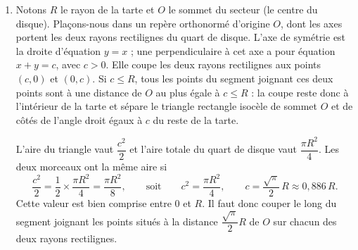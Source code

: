 \begin{enumerate}
\begin{enumerate}
    \item La subvention de 1000 euros est versée par l'État et vient en déduction de ce que paie le groupe.

    Pour $n = 90$, la recette doit être de 4000 euros, dont 1000 euros viennent de l'État ; le groupe paie donc 3000 euros, soit $\dfrac{3000}{90} = 33{,}333\ldots$ euros par personne, c'est-à-dire $33{,}34$ euros (arrondi au centime supérieur).

    Pour $n = 120$, chacun doit son menu à 40 euros (la recette est $4800 \geqslant 4000$ euros) et la subvention de 1000 euros se répartit entre les 120 convives : chacun paie $40 - \dfrac{1000}{120} = 31{,}666\ldots$, soit environ $31{,}67$ euros.

    Pour comparer, notons $P(n)$ le prix payé par chaque convive.
    \begin{itemize}
        \item Si $n \geqslant 100$, $P(n) = 40 - \dfrac{1000}{n}$. Cette quantité est croissante avec $n$ (car $\dfrac{1000}{n}$ décroît), donc elle est minimale pour $n = 100$ et vaut alors $30$ euros.
        \item Si $n < 100$, $P(n) = \dfrac{4000 - 1000}{n} = \dfrac{3000}{n}$. Cette quantité est décroissante avec $n$, donc elle est minimale pour $n = 99$, et vaut $\dfrac{3000}{99} \approx 30{,}30 > 30 = \dfrac{3000}{100}$.
    \end{itemize}
    Conclusion : le prix par convive est minimal lorsque \emph{exactement} $100$ personnes viennent, et il vaut alors $30$ euros.
\end{enumerate}

\item Notons $R$ le rayon de la tarte et $O$ le sommet du secteur (le centre du disque). Plaçons-nous dans un repère orthonormé d'origine $O$, dont les axes portent les deux rayons rectilignes du quart de disque. L'axe de symétrie est la droite d'équation $y = x$ ; une perpendiculaire à cet axe a pour équation $x + y = c$, avec $c > 0$. Elle coupe les deux rayons rectilignes aux points $(c, 0)$ et $(0, c)$. Si $c \leqslant R$, tous les points du segment joignant ces deux points sont à une distance de $O$ au plus égale à $c \leqslant R$ : la coupe reste donc à l'intérieur de la tarte et sépare le triangle rectangle isocèle de sommet $O$ et de côtés de l'angle droit égaux à $c$ du reste de la tarte.

L'aire du triangle vaut $\dfrac{c^2}{2}$ et l'aire totale du quart de disque vaut $\dfrac{\pi R^2}{4}$. Les deux morceaux ont la même aire si
\[\frac{c^2}{2} = \frac{1}{2} \times \frac{\pi R^2}{4} = \frac{\pi R^2}{8}, \qquad \text{soit} \qquad c^2 = \frac{\pi R^2}{4}, \qquad c = \frac{\sqrt{\pi}}{2}\,R \approx 0{,}886\,R.\]
Cette valeur est bien comprise entre $0$ et $R$. Il faut donc couper le long du segment joignant les points situés à la distance $\dfrac{\sqrt{\pi}}{2}R$ de $O$ sur chacun des deux rayons rectilignes.


\end{enumerate}
